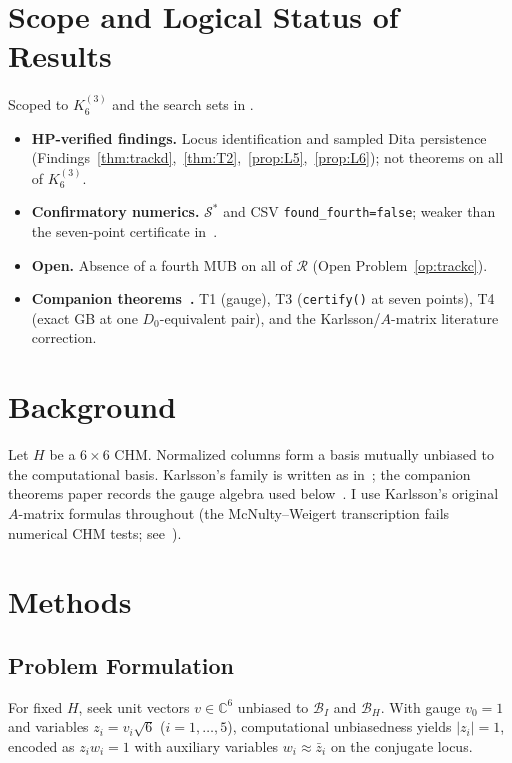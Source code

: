\documentclass[onecolumn]{IEEEtran}
\begin{document}
\section{Scope and Logical Status of Results}
\label{sec:scope}

Scoped to $K_6^{(3)}$ and the search sets in .
\begin{itemize}
    \item \textbf{HP-verified findings.} Locus identification and sampled Dita persistence (Findings~\ref{thm:trackd},~\ref{thm:T2},~\ref{prop:L5},~\ref{prop:L6}); not theorems on all of $K_6^{(3)}$.
    \item \textbf{Confirmatory numerics.} $\mathcal{S}^*$ and CSV \texttt{found\_fourth=false}; weaker than the seven-point certificate in~\cite{JaupiTheorems2026}.
    \item \textbf{Open.} Absence of a fourth MUB on all of $\mathcal{R}$ (Open Problem~\ref{op:trackc}).
    \item \textbf{Companion theorems~\cite{JaupiTheorems2026}.} T1 (gauge), T3 (\texttt{certify()} at seven points), T4 (exact GB at one $D_0$-equivalent pair), and the Karlsson/$A$-matrix literature correction.
\end{itemize}

\section{Background}
\label{sec:background}

Let $H$ be a $6\times6$ CHM. Normalized columns form a basis mutually unbiased to the computational basis.
Karlsson's family is written as in~\cite{Karlsson2011, McNulty2026}; the companion theorems paper records the gauge algebra used below~\cite{JaupiTheorems2026}.
I use Karlsson's original $A$-matrix formulas throughout (the McNulty--Weigert transcription fails numerical CHM tests; see~\cite{JaupiTheorems2026}).

\section{Methods}
\label{sec:methods}

\subsection{Problem Formulation}
For fixed $H$, seek unit vectors $v\in\mathbb{C}^6$ unbiased to $\mathcal{B}_I$ and $\mathcal{B}_H$.
With gauge $v_0=1$ and variables $z_i=v_i\sqrt{6}$ ($i=1,\ldots,5$), computational unbiasedness yields $|z_i|=1$, encoded as $z_i w_i=1$ with auxiliary variables $w_i\approx\bar z_i$ on the conjugate locus.
\end{document}
